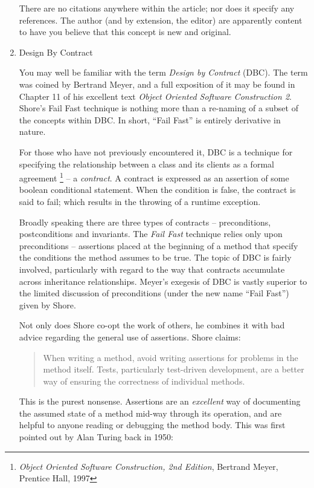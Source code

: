 \documentclass{article}
\begin{document}
\begin{enumerate}
There are no citations anywhere within the article; nor does it specify
any references. The author (and by extension, the editor) are apparently
content to have you believe that this concept is new and original.

\item Design By Contract
\label{sec:orgheadline412}

You may well be familiar with the term \emph{Design by Contract} (DBC). The
term was coined by Bertrand Meyer, and a full exposition of it may be
found in Chapter 11 of his excellent text \emph{Object Oriented Software
Construction 2}. Shore's Fail Fast technique is nothing more than a
re-naming of a subset of the concepts within DBC. In short, “Fail Fast”
is entirely derivative in nature.

For those who have not previously encountered it, DBC is a technique for
specifying the relationship between a class and its clients as a formal
agreement \footnote{\emph{Object Oriented Software Construction, 2nd Edition}, Bertrand
Meyer, Prentice Hall, 1997} -- a \emph{contract}. A contract is expressed as an assertion
of some boolean conditional statement. When the condition is false, the
contract is said to fail; which results in the throwing of a runtime
exception.

Broadly speaking there are three types of contracts -- preconditions,
postconditions and invariants. The \emph{Fail Fast} technique relies only
upon preconditions -- assertions placed at the beginning of a method
that specify the conditions the method assumes to be true. The topic of
DBC is fairly involved, particularly with regard to the way that
contracts accumulate across inheritance relationships. Meyer's exegesis
of DBC is vastly superior to the limited discussion of preconditions
(under the new name “Fail Fast”) given by Shore.

Not only does Shore co-opt the work of others, he combines it with bad
advice regarding the general use of assertions. Shore claims:

\begin{quote}
When writing a method, avoid writing assertions for problems in the
method itself. Tests, particularly test-driven development, are a
better way of ensuring the correctness of individual methods.
\end{quote}

This is the purest nonsense. Assertions are an \emph{excellent} way of
documenting the assumed state of a method mid-way through its operation,
and are helpful to anyone reading or debugging the method body. This was
first pointed out by Alan Turing back in 1950:


\end{enumerate}
\end{document}
